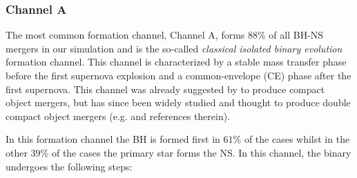 \documentclass[a4paper,fleqn,usenatbib,useAMS,usedcolumn]{mnras}
\begin{document}
\subsubsection{Channel A}
The most common formation channel, {Channel A}, forms $88\%$ of  all BH-NS mergers in our simulation and  is the so-called \emph{classical isolated binary evolution} formation channel. This channel is characterized by a stable mass transfer phase before the first supernova explosion and a common-envelope (CE) phase after the first supernova. This channel was already suggested by \citet{smarr1976binary} to produce compact object mergers, but has since been widely studied and thought to produce double compact object mergers (e.g. \citealt{bethe1998evolution, voss2003galactic, postnov2014evolution, tauris2017formation, mandel2018merging} and references therein).   




In  this formation channel the BH is formed first in $61\%$ of the cases whilst in the other $39\%$ of the cases the primary star forms the NS. 
 In this channel, the binary undergoes the following steps:
% 
\end{document}
